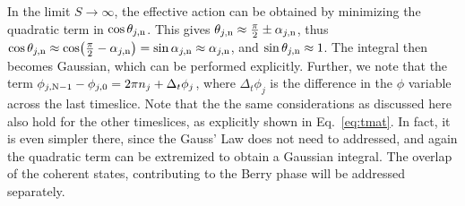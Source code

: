 \documentclass[aps,prl,reprint,twocolumn,superscriptaddress,floatfix,nofootinbib]{revtex4-1}
\begin{document}
In the limit $S \to \infty$, the effective action can be obtained by minimizing the quadratic term in $\cos \theta_{j,{\rm n}}$. This gives $\theta_{j, {\rm n}} \approx \frac{\pi}{2} \pm \alpha_{j,{\rm n}}$, thus $\cos \theta_{j,{\rm n}} \approx \cos (\frac{\pi}{2} - \alpha_{j,{\rm n}}) = \sin \alpha_{j,{\rm n}} \approx \alpha_{j,{\rm n}}$, and $\sin \theta_{j,{\rm n}} \approx 1$. The integral then becomes Gaussian, which can be performed explicitly. Further, we note that the term $\phi_{j,{\rm N-1}} - \phi_{j,0} = 2 \pi n_j + \Delta_t \phi_j$, where $\Delta_t \phi_j$ is the difference in the $\phi$ variable across the last timeslice. Note that the the same considerations as discussed here also hold for the other timeslices, as explicitly shown in Eq.~{\eqref{eq:tmat}}. In fact, it is even simpler there, since the Gauss' Law does not need to addressed, and again the quadratic term can be extremized to obtain a Gaussian integral. The overlap of the coherent states, contributing to the Berry phase will be addressed separately.
\end{document}
